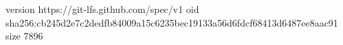 version https://git-lfs.github.com/spec/v1
oid sha256:cb245d2e7c2dedfb84009a15c6235bec19133a56d6fdcf68413d6487ee8aac91
size 7896
